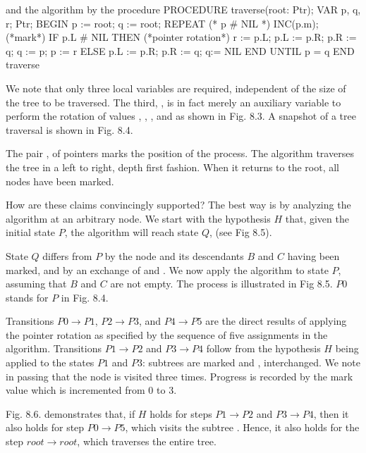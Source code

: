 \noindent and the algorithm by the procedure
\begintt
PROCEDURE traverse(root: Ptr); VAR p, q, r; Ptr;
BEGIN p := root; q := root;
  REPEAT (* p # NIL *) INC(p.m); (*mark*)
    IF p.L # NIL THEN (*pointer rotation*)
      r := p.L; p.L := p.R; p.R := q; q := p; p := r
    ELSE
      p.L := p.R; p.R := q; q:= NIL
    END
  UNTIL p = q
END traverse
\endtt

\noindent We note that only three local variables are required, independent of the size of the tree to be traversed. The third, , is in fact merely an auxiliary variable to perform the rotation of values , , , and  as shown in Fig. 8.3. A snapshot of a tree traversal is shown in Fig. 8.4.


The pair ,  of pointers marks the position of the process. The algorithm traverses the tree in a left to right, depth first fashion. When it returns to the root, all nodes have been marked.

How are these claims convincingly supported? The best way is by analyzing the algorithm at an arbitrary node. We start with the hypothesis $H$ that, given the initial state $P$, the algorithm will reach state $Q$, (see Fig 8.5).

State $Q$ differs from $P$ by the node and its descendants $B$ and $C$ having been marked, and by an exchange of  and . We now apply the algorithm to state $P$, assuming that $B$ and $C$ are not empty. The process is illustrated in Fig 8.5. $P0$ stands for $P$ in Fig. 8.4.


Transitions $P0 \to P1$, $P2 \to P3$, and $P4 \to P5$ are the direct results of applying the pointer rotation as specified by the sequence of five assignments in the algorithm. Transitions $P1 \to P2$ and $P3 \to P4$ follow from the hypothesis $H$ being applied to the states $P1$ and $P3$: subtrees are marked and ,  interchanged. We note in passing that the node is visited three times. Progress is recorded by the mark value which is incremented from 0 to 3.

Fig. 8.6. demonstrates that, if $H$ holds for steps $P1 \to P2$ and $P3 \to P4$, then it also holds for step $P0 \to P5$, which visits the subtree . Hence, it also holds for the step $root \to root$, which traverses the entire tree.


